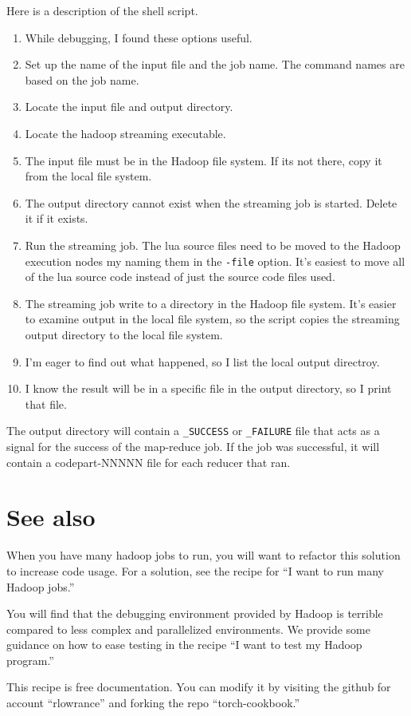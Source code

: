 \documentclass{article}
\let\code\texttt %
\begin{document}
Here is a description of the shell script.
\begin{enumerate}
\item While debugging, I found these options useful.
\item Set up the name of the input file and the job name. The command
names are based on the job name.
\item Locate the input file and output directory.
\item Locate the hadoop streaming executable.
\item The input file must be in the Hadoop file system. If its not
there, copy it from the local file system.
\item The output directory cannot exist when the streaming job is
started. Delete it if it exists.
\item Run the streaming job. The lua source files need to be moved to
the Hadoop execution nodes my naming them in the \code{-file} option.
It's easiest to move all of the lua source code instead of just the
source code files used.
\item The streaming job write to a directory in the Hadoop file system.
It's easier to examine output in the local file system, so the script
copies the streaming output directory to the local file system. 
\item I'm eager to find out what happened, so I list the local output
directroy.
\item I know the result will be in a specific file in the output
directory, so I print that file.
\end{enumerate}


The output directory will contain a \code{\_SUCCESS} or \code{\_FAILURE}
file that acts as a signal for the success of the map-reduce job. If the
job was successful, it will contain a code{part-NNNNN} file for each
reducer that ran.


\section{See also}

When you have many hadoop jobs to run, you will want to refactor this
solution to increase code usage. For a solution, see the recipe for ``I
want to run many Hadoop jobs.''

You will find that the debugging environment provided by Hadoop is
terrible compared to less complex and parallelized environments. We
provide some guidance on how to ease testing in the recipe ``I want to
test my Hadoop program.''

This recipe is free documentation. You can modify it by visiting the
github for account ``rlowrance'' and forking the repo
``torch-cookbook.''
\end{document}
